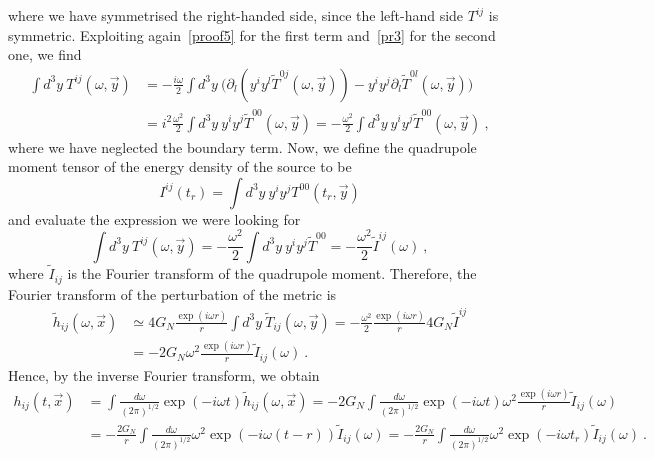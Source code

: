 \documentclass[a4paper]{article}
\begin{document}
    where we have symmetrised the right-handed side, since the left-hand side $T^{ij}$ is symmetric. Exploiting again~\eqref{proof5} for the first term and~\eqref{pr3} for the second one, we find
    \begin{equation*}
    \begin{aligned}
        \int d^3 y ~ T^{ij} (\omega, \vec y) & = - \frac{i \omega}{2} \int d^3 y ~ \Big (\partial_l (y^i y^l \tilde T^{0j} (\omega, \vec y) ) - y^i y^j \partial_l \tilde T^{0l} (\omega, \vec y) \Big ) \\ & = i^2 \frac{\omega^2}{2} \int d^3 y ~ y^i y^j \tilde T^{00} (\omega, \vec y) = - \frac{\omega^2}{2} \int d^3 y ~ y^i y^j \tilde T^{00} (\omega, \vec y) ~,
    \end{aligned}
    \end{equation*}
    where we have neglected the boundary term. Now, we define the quadrupole moment tensor of the energy density of the source to be
    \begin{equation}\label{quad}
        I^{ij} (t_r) = \int d^3 y ~ y^i y^j T^{00} (t_r, \vec y) 
    \end{equation}
    and evaluate the expression we were looking for
    \begin{equation*}
        \int d^3 y ~ T^{ij} (\omega, \vec y) = - \frac{\omega^2}{2} \int d^3 y ~ y^i y^j \tilde T^{00} = - \frac{\omega^2}{2} \tilde I^{ij} (\omega) ~,
    \end{equation*}
    where $\tilde I_{ij}$ is the Fourier transform of the quadrupole moment. Therefore, the Fourier transform of the perturbation of the metric is
    \begin{equation*}
    \begin{aligned}
        \tilde h _{ij} (\omega, \vec x) & \simeq 4 G_N \frac{\exp(i \omega r)}{r} \int d^3 y ~ \tilde T_{ij} (\omega, \vec{y})  = - \frac{\omega^2}{2} \frac{\exp(i \omega r)}{r} 4 G_N \tilde I^{ij} \\ & = - 2 G_N \omega^2 \frac{\exp(i \omega r)}{r} \tilde I_{ij} (\omega) ~.
    \end{aligned}
    \end{equation*}
    Hence, by the inverse Fourier transform, we obtain
    \begin{equation*}
    \begin{aligned}
        h_{ij} (t, \vec x) & = \int \frac{d\omega}{(2\pi)^{1/2}} \exp(- i \omega t) \tilde h _{ij} (\omega, \vec x) = - 2 G_N \int \frac{d\omega}{(2\pi)^{1/2}} \exp(- i \omega t) \omega^2 \frac{\exp(i \omega r)}{r} \tilde I_{ij} (\omega) \\ & = - \frac{2 G_N}{r} \int \frac{d\omega}{(2\pi)^{1/2}} \omega^2 \exp(- i \omega (t - r)) \tilde I_{ij} (\omega) = - \frac{2 G_N}{r} \int \frac{d\omega}{(2\pi)^{1/2}} \omega^2 \exp(- i \omega t_r) \tilde I_{ij} (\omega) ~.
    \end{aligned}
    \end{equation*}
\end{document}
